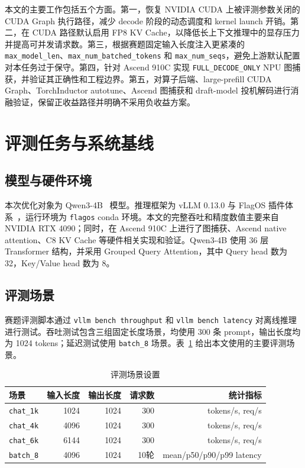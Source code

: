 \documentclass[UTF8,10.5pt]{ctexart}
\newcommand{\code}[1]{\texttt{#1}}
\begin{document}
本文的主要工作包括五个方面。第一，恢复 NVIDIA CUDA 上被评测参数关闭的 CUDA Graph 执行路径，减少 decode 阶段的动态调度和 kernel launch 开销。第二，在 CUDA 路径默认启用 FP8 KV Cache，以降低长上下文推理中的显存压力并提高可并发请求数。第三，根据赛题固定输入长度注入更紧凑的 \code{max\_model\_len}、\code{max\_num\_batched\_tokens} 和 \code{max\_num\_seqs}，避免上游默认配置对本任务过于保守。第四，针对 Ascend 910C 实现 \code{FULL\_DECODE\_ONLY} NPU 图捕获，并验证其正确性和工程边界。第五，对算子后端、large-prefill CUDA Graph、TorchInductor autotune、Ascend 图捕获和 draft-model 投机解码进行消融验证，保留正收益路径并明确不采用负收益方案。

\section{评测任务与系统基线}

\subsection{模型与硬件环境}

本次优化对象为 Qwen3-4B~\cite{qwen3} 模型。推理框架为 vLLM 0.13.0 与 FlagOS 插件体系~\cite{flagos}，运行环境为 \code{flagos} conda 环境。本文的完整吞吐和精度数值主要来自 NVIDIA RTX 4090；同时，在 Ascend 910C 上进行了图捕获、Ascend native attention、C8 KV Cache 等硬件相关实现和验证。Qwen3-4B 使用 36 层 Transformer 结构，并采用 Grouped Query Attention，其中 Query head 数为 32，Key/Value head 数为 8。

\subsection{评测场景}

赛题评测脚本通过 \code{vllm bench throughput} 和 \code{vllm bench latency} 对离线推理进行测试。吞吐测试包含三组固定长度场景，均使用 300 条 prompt，输出长度均为 1024 tokens；延迟测试使用 \code{batch\_8} 场景。表~\ref{tab:scenarios} 给出本文使用的主要评测场景。

\begin{table}[H]
\centering
\caption{评测场景设置}
\label{tab:scenarios}
\begin{tabular}{lrrrr}
\toprule
场景 & 输入长度 & 输出长度 & 请求数 & 统计指标 \\
\midrule
\code{chat\_1k} & 1024 & 1024 & 300 & tokens/s, req/s \\
\code{chat\_4k} & 4096 & 1024 & 300 & tokens/s, req/s \\
\code{chat\_6k} & 6144 & 1024 & 300 & tokens/s, req/s \\
\code{batch\_8} & 4096 & 1024 & 10轮 & mean/p50/p90/p99 latency \\
\bottomrule
\end{tabular}
\end{table}
\end{document}
